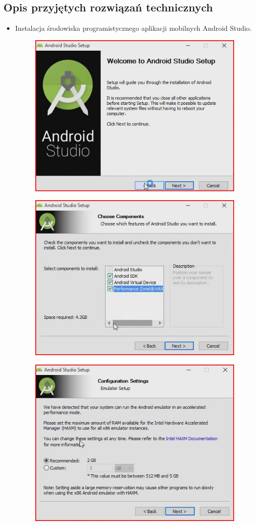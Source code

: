 \subsection{Opis przyjętych rozwiązań technicznych}
\begin{itemize}
\item Instalacja środowiska programistycznego aplikacji mobilnych Android Studio.

\begin{figure}[h!]
\centering
\includegraphics[width=0.5\linewidth]{fig/i1}
\caption{}
\label{fig:11}
\end{figure}

\begin{figure}[h!]
\centering
\includegraphics[width=0.5\linewidth]{fig/i2}
\caption{}
\label{fig:11}
\end{figure}

\begin{figure}[h!]
\centering
\includegraphics[width=0.5\linewidth]{fig/i3}
\caption{}
\label{fig:11}
\end{figure}


\end{itemize}
